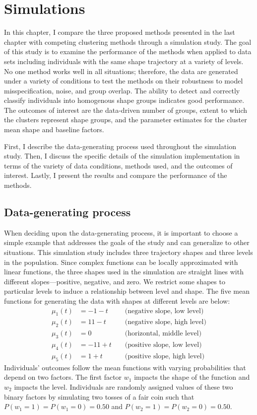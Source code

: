 \chapter{Simulations}
\label{chap:sim}
In this chapter, I compare the three proposed methods presented in the last chapter with competing clustering methods through a simulation study. The goal of this study is to examine the performance of the methods when applied to data sets including individuals with the same shape trajectory at a variety of levels. No one method works well in all situations; therefore, the data are generated under a variety of conditions to test the methods on their robustness to model misspecification, noise, and group overlap. The ability to detect and correctly classify individuals into homogenous shape groups indicates good performance. The outcomes of interest are the data-driven number of groups, extent to which the clusters represent shape groups, and the parameter estimates for the cluster mean shape and baseline factors. 

First, I describe the data-generating process used throughout the simulation study. Then, I discuss the specific details of the simulation implementation in terms of the variety of data conditions, methods used, and the outcomes of interest. Lastly, I present the results and compare the performance of the methods.
\section{Data-generating process}
When deciding upon the data-generating process, it is important to choose a simple example that addresses the goals of the study and can generalize to other situations. This simulation study includes three trajectory shapes and three levels in the population. Since complex functions can be locally approximated with linear functions, the three shapes used in the simulation are straight lines with different slopes---positive, negative, and zero. We restrict some shapes to particular levels to induce a relationship between level and shape. The five mean functions for generating the data with shapes at different levels are below:   
\begin{align*}
\mu_{1}(t) &= -1 - t &&\text{ (negative slope, low level)}\\
\mu_{2}(t) &= 11 - t&&\text{ (negative slope, high level)}\\
\mu_{3}(t) &= 0&&\text{ (horizontal, middle level)}\\
\mu_{4}(t) &= -11 + t&&\text{ (positive slope, low level)}\\
\mu_{5}(t) &= 1 + t&&\text{ (positive slope, high level)}
\end{align*} 
Individuals' outcomes follow the mean functions with varying probabilities that depend on two factors. The first factor $w_{1}$ impacts the shape of the function and $w_{2}$ impacts the level. Individuals are randomly assigned values of these two binary factors by simulating two tosses of a fair coin such that $P(w_{1}=1) = P(w_{1}=0) = 0.50$ and $P(w_{2}=1) = P(w_{2}=0)=0.50$. 



